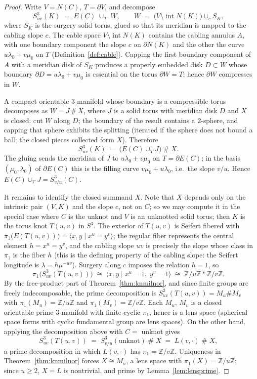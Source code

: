 \documentclass[11pt]{article}
\theoremstyle{definition}
\theoremstyle{remark}
\newcommand{\Z}{\mathbb{Z}}
\begin{document}
\begin{proof}
Write $V=N(C)$, $T=\partial V$, and decompose
\[
S^3_{uv}(K)\;=\;E(C)\;\cup_{T}\;W,\qquad
W\;=\;\bigl(V\setminus \operatorname{int}N(K)\bigr)\cup_{c} S_K,
\]
where $S_K$ is the surgery solid torus, glued so that its meridian is mapped
to the cabling slope $c$.  The cable space $V\setminus\operatorname{int}N(K)$
contains the cabling annulus $A$, with one boundary component the slope $c$
on $\partial N(K)$ and the other the curve $u\lambda_0+v\mu_0$ on $T$
(Definition~\ref{def:cable}).  Capping the first boundary component of $A$
with a meridian disk of $S_K$ produces a properly embedded disk $D\subset W$
whose boundary $\partial D=u\lambda_0+v\mu_0$ is essential on the torus
$\partial W=T$; hence $\partial W$ compresses in $W$.

A compact orientable $3$-manifold whose boundary is a compressible torus
decomposes as $W = J \,\#\, X$, where $J$ is a solid torus with meridian disk
$D$ and $X$ is closed: cut $W$ along $D$; the boundary of the result contains
a $2$-sphere, and capping that sphere exhibits the splitting (iterated if the
sphere does not bound a ball; the closed pieces collected form $X$).
Therefore
\[
S^3_{uv}(K)\;=\;\bigl(E(C)\cup_T J\bigr)\;\#\;X.
\]
The gluing sends the meridian of $J$ to $u\lambda_0+v\mu_0$ on
$T=\partial E(C)$; in the basis $(\mu_0,\lambda_0)$ of $\partial E(C)$ this is
the filling curve $v\mu_0+u\lambda_0$, i.e.\ the slope $v/u$.  Hence
$E(C)\cup_T J=S^3_{v/u}(C)$.

It remains to identify the closed summand $X$.  Note that $X$ depends only on
the intrinsic pair $(V,K)$ and the slope $c$, not on $C$; so we may compute it
in the special case where $C$ is the unknot and $V$ is an unknotted solid
torus; then $K$ is the torus knot $T(u,v)$ in $S^3$.  The exterior of
$T(u,v)$ is Seifert fibered with $\pi_1\bigl(E(T(u,v))\bigr)=\langle x,y\mid
x^u=y^v\rangle$; the regular fiber represents the central element
$h=x^u=y^v$, and the cabling slope $uv$ is precisely the slope whose class in
$\pi_1$ is the fiber $h$ (this is the defining property of the cabling slope:
the Seifert longitude is $\lambda=h\mu^{-uv}$).  Surgery along $c$ imposes the
relation $h=1$, so
\[
\pi_1\bigl(S^3_{uv}(T(u,v))\bigr)
\;\cong\;\langle x,y\mid x^u=1,\;y^v=1\rangle
\;\cong\;\Z/u\Z * \Z/v\Z .
\]
By the free-product part of Theorem~\ref{thm:knmilnor}, and since finite
groups are freely indecomposable, the prime decomposition is
$S^3_{uv}(T(u,v))=M_u\# M_v$ with $\pi_1(M_u)=\Z/u\Z$ and
$\pi_1(M_v)=\Z/v\Z$.  Each $M_u$, $M_v$ is a closed orientable prime
$3$-manifold with finite cyclic $\pi_1$, hence is a lens space
(spherical space forms with cyclic fundamental group are lens spaces).
On the other hand, applying the decomposition above with $C=$ unknot gives
\[
S^3_{uv}(T(u,v))\;=\;S^3_{v/u}(\text{unknot})\;\#\;X
\;=\;L(v,\cdot)\;\#\;X,
\]
a prime decomposition in which $L(v,\cdot)$ has $\pi_1=\Z/v\Z$.  Uniqueness
in Theorem~\ref{thm:knmilnor} forces $X\cong M_u$, a lens space with
$\pi_1(X)=\Z/u\Z$; since $u\ge 2$, $X=L$ is nontrivial, and prime by
Lemma~\ref{lem:lensprime}.


\end{proof}
\end{document}

